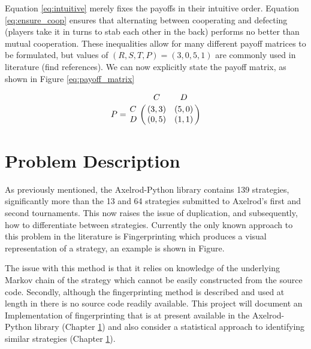 Equation \ref{eq:intuitive} merely fixes the payoffs in their intuitive order.
Equation \ref{eq:ensure_coop} ensures that alternating between cooperating and defecting (players take it in turns to stab each other in the back) performs no better than mutual cooperation.
These inequalities allow for many different payoff matrices to be formulated, but values of $(R, S, T, P) = (3, 0, 5, 1)$ are commonly used in literature (find references). %
We can now explicitly state the payoff matrix, as shown in Figure \ref{eq:payoff_matrix}


\begin{equation}\label{eq:payoff_matrix}
%
P = \bordermatrix{~ & C & D \cr
                  C & (3, 3) & (5, 0) \cr
                  D & (0, 5) & (1, 1) \cr}
%
\end{equation}

\section{Problem Description}

As previously mentioned, the Axelrod-Python library contains 139 strategies,
significantly more than the 13 and 64 strategies submitted to Axelrod's first
and second tournaments.  %
This now raises the issue of duplication, and subsequently, how to differentiate between strategies.
Currently the only known approach to this problem in the literature is Fingerprinting which produces a visual representation of a strategy, an example is shown in Figure. %

The issue with this method is that it relies on knowledge of the underlying Markov chain of the strategy which cannot be easily constructed from the source code.
Secondly, although the fingerprinting method is described and used at length in
\cite{} there is no source code readily available. This project will document an
Implementation of fingerprinting that is at present available in the
Axelrod-Python library (Chapter \ref{}) and also consider a statistical approach to identifying
similar strategies (Chapter \ref{}).  %


